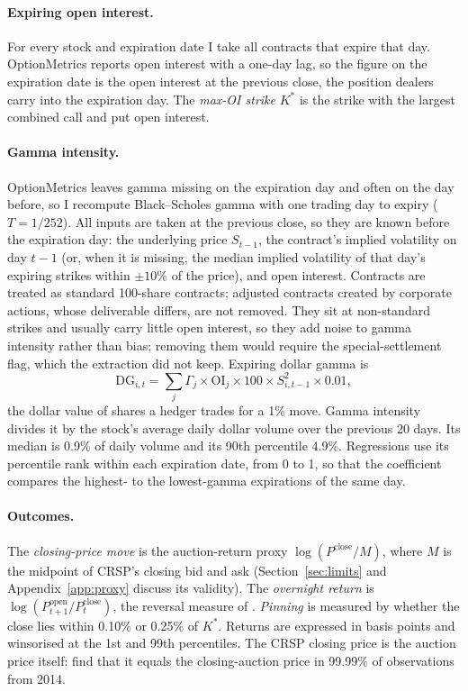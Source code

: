 \documentclass[11pt,a4paper]{article}
\newcommand{\Kstar}{K^{*}}
\begin{document}
\paragraph{Expiring open interest.} For every stock and expiration date I take all contracts that expire that day. OptionMetrics reports open interest with a one-day lag, so the figure on the expiration date is the open interest at the previous close, the position dealers carry into the expiration day. The \emph{max-OI strike} $\Kstar$ is the strike with the largest combined call and put open interest.

\paragraph{Gamma intensity.} OptionMetrics leaves gamma missing on the expiration day and often on the day before, so I recompute Black--Scholes gamma with one trading day to expiry ($T=1/252$). All inputs are taken at the previous close, so they are known before the expiration day: the underlying price $S_{t-1}$, the contract's implied volatility on day $t-1$ (or, when it is missing, the median implied volatility of that day's expiring strikes within $\pm10\%$ of the price), and open interest. Contracts are treated as standard 100-share contracts; adjusted contracts created by corporate actions, whose deliverable differs, are not removed. They sit at non-standard strikes and usually carry little open interest, so they add noise to gamma intensity rather than bias; removing them would require the special-settlement flag, which the extraction did not keep. Expiring dollar gamma is
\begin{equation}
\mathrm{DG}_{i,t} = \sum_{j} \Gamma_{j}\times \mathrm{OI}_{j}\times 100\times S_{i,t-1}^{2}\times 0.01,
\end{equation}
the dollar value of shares a hedger trades for a 1\% move. Gamma intensity divides it by the stock's average daily dollar volume over the previous 20 days. Its median is 0.9\% of daily volume and its 90th percentile 4.9\%. Regressions use its percentile rank within each expiration date, from 0 to 1, so that the coefficient compares the highest- to the lowest-gamma expirations of the same day.

\paragraph{Outcomes.} The \emph{closing-price move} is the auction-return proxy $\log(P^{\text{close}}/M)$, where $M$ is the midpoint of CRSP's closing bid and ask (Section~\ref{sec:limits} and Appendix~\ref{app:proxy} discuss its validity). The \emph{overnight return} is $\log(P^{\text{open}}_{t+1}/P^{\text{close}}_{t})$, the reversal measure of \citet{ComertonFordeRindi2022}. \emph{Pinning} is measured by whether the close lies within 0.10\% or 0.25\% of $\Kstar$. Returns are expressed in basis points and winsorised at the 1st and 99th percentiles. The CRSP closing price is the auction price itself: \citet{BogousslavskyMuravyev2023} find that it equals the closing-auction price in 99.99\% of observations from 2014.
\end{document}

